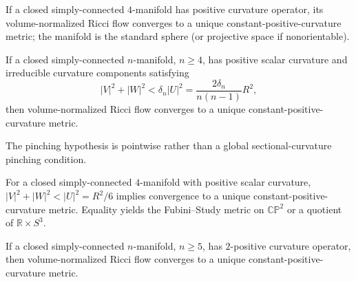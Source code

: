 \begin{theorem}
\label{thm:chow-iv-hamilton-positive-curvature-operator}

If a closed simply-connected $4$-manifold has positive curvature operator, its
volume-normalized Ricci flow converges to a unique constant-positive-curvature
metric; the manifold is the standard sphere (or projective space if
nonorientable).
\end{theorem}

\begin{theorem}
\label{thm:chow-iv-huisken-pinching}

If a closed simply-connected $n$-manifold, $n\ge4$, has positive scalar
curvature and irreducible curvature components satisfying
\[
 |V|^2+|W|^2<\delta_n|U|^2=\frac{2\delta_n}{n(n-1)}R^2,
\]
then volume-normalized Ricci flow converges to a unique constant-positive-
curvature metric.
\end{theorem}

\begin{remark}
\label{rem:chow-iv-pointwise-pinching}

The pinching hypothesis is pointwise rather than a global sectional-curvature
pinching condition.
\end{remark}

\begin{theorem}
\label{thm:chow-iv-margerin-pinching}

For a closed simply-connected $4$-manifold with positive scalar curvature,
$|V|^2+|W|^2<|U|^2=R^2/6$ implies convergence to a unique constant-positive-
curvature metric.  Equality yields the Fubini--Study metric on $\mathbb{CP}^2$
or a quotient of $\mathbb R\times S^3$.
\end{theorem}

\begin{theorem}
\label{thm:chow-iv-two-positive-curvature}

If a closed simply-connected $n$-manifold, $n\ge5$, has $2$-positive
curvature operator, then volume-normalized Ricci flow converges to a unique
constant-positive-curvature metric.
\end{theorem}

